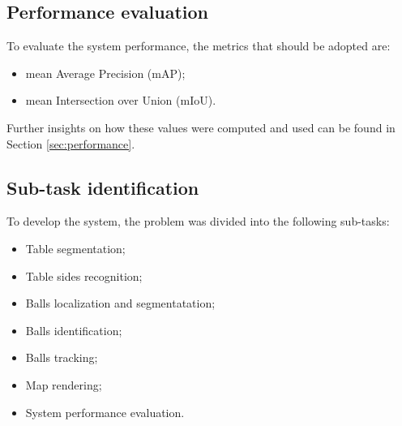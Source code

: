 



\subsection{Performance evaluation}
To evaluate the system performance, the metrics that should be adopted are:
\begin{itemize}
    \item mean Average Precision (mAP);
    \item mean Intersection over Union (mIoU).
\end{itemize}
\begin{flushleft}
Further insights on how these values were computed and used can be found in Section \ref{sec:performance}.
\end{flushleft}


\subsection{Sub-task identification}
To develop the system, the problem was divided into the following sub-tasks:
\begin{itemize}
    \item Table segmentation;
    \item Table sides recognition;
    \item Balls localization and segmentatation;
    \item Balls identification;
    \item Balls tracking;
    \item Map rendering;
    \item System performance evaluation.
\end{itemize}